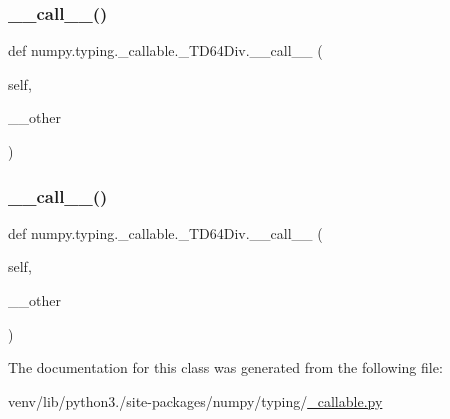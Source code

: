 \subsubsection{\texorpdfstring{\+\_\+\+\_\+call\+\_\+\+\_\+()}{\_\_call\_\_()}\hspace{0.1cm}{\footnotesize\ttfamily [2/3]}}
{\footnotesize\ttfamily def numpy.\+typing.\+\_\+callable.\+\_\+\+T\+D64\+Div.\+\_\+\+\_\+call\+\_\+\+\_\+ (\begin{DoxyParamCaption}\item[{}]{self,  }\item[{}]{\+\_\+\+\_\+other }\end{DoxyParamCaption})}

\mbox{\label{classnumpy_1_1typing_1_1__callable_1_1__TD64Div_ac24eacd4705b4eab9ba774199ae242c7}} 
\subsubsection{\texorpdfstring{\+\_\+\+\_\+call\+\_\+\+\_\+()}{\_\_call\_\_()}\hspace{0.1cm}{\footnotesize\ttfamily [3/3]}}
{\footnotesize\ttfamily def numpy.\+typing.\+\_\+callable.\+\_\+\+T\+D64\+Div.\+\_\+\+\_\+call\+\_\+\+\_\+ (\begin{DoxyParamCaption}\item[{}]{self,  }\item[{}]{\+\_\+\+\_\+other }\end{DoxyParamCaption})}



The documentation for this class was generated from the following file\+:\begin{DoxyCompactItemize}
\item 
venv/lib/python3./site-\/packages/numpy/typing/\hyperlink{__callable_8py}{\+\_\+callable.\+py}\end{DoxyCompactItemize}
